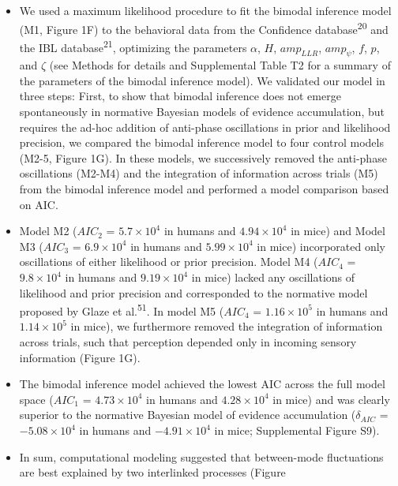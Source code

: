 \documentclass[
]{article}
\begin{document}
\begin{itemize}
\item
  We used a maximum likelihood procedure to fit the bimodal inference
  model (M1, Figure 1F) to the behavioral data from the Confidence
  database\textsuperscript{20} and the IBL database\textsuperscript{21},
  optimizing the parameters \(\alpha\), \(H\), \(amp_{LLR}\),
  \(amp_{\psi}\), \(f\), \(p\), and \(\zeta\) (see Methods for details
  and Supplemental Table T2 for a summary of the parameters of the
  bimodal inference model). We validated our model in three steps:
  First, to show that bimodal inference does not emerge spontaneously in
  normative Bayesian models of evidence accumulation, but requires the
  ad-hoc addition of anti-phase oscillations in prior and likelihood
  precision, we compared the bimodal inference model to four control
  models (M2-5, Figure 1G). In these models, we successively removed the
  anti-phase oscillations (M2-M4) and the integration of information
  across trials (M5) from the bimodal inference model and performed a
  model comparison based on AIC.
\item
  Model M2 (\(AIC_2\) = \(\ensuremath{5.7\times 10^{4}}\) in humans and
  \(\ensuremath{4.94\times 10^{4}}\) in mice) and Model M3 (\(AIC_3\) =
  \(\ensuremath{6.9\times 10^{4}}\) in humans and
  \(\ensuremath{5.99\times 10^{4}}\) in mice) incorporated only
  oscillations of either likelihood or prior precision. Model M4
  (\(AIC_4\) = \(\ensuremath{9.8\times 10^{4}}\) in humans and
  \(\ensuremath{9.19\times 10^{4}}\) in mice) lacked any oscillations of
  likelihood and prior precision and corresponded to the normative model
  proposed by Glaze et al.\textsuperscript{51}. In model M5 (\(AIC_4\) =
  \(\ensuremath{1.16\times 10^{5}}\) in humans and
  \(\ensuremath{1.14\times 10^{5}}\) in mice), we furthermore removed
  the integration of information across trials, such that perception
  depended only in incoming sensory information (Figure 1G).
\item
  The bimodal inference model achieved the lowest AIC across the full
  model space (\(AIC_1\) = \(\ensuremath{4.73\times 10^{4}}\) in humans
  and \(\ensuremath{4.28\times 10^{4}}\) in mice) and was clearly
  superior to the normative Bayesian model of evidence accumulation
  (\(\delta_{AIC}\) = \(\ensuremath{-5.08\times 10^{4}}\) in humans and
  \(\ensuremath{-4.91\times 10^{4}}\) in mice; Supplemental Figure S9).
\item
  In sum, computational modeling suggested that between-mode
  fluctuations are best explained by two interlinked processes (Figure

\end{itemize}
\end{document}
